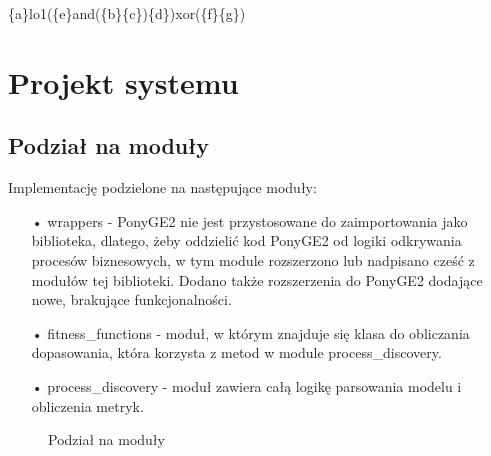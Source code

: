 \begin{center}
\{a\}lo1(\{e\}and(\{b\}\{c\})\{d\})xor(\{f\}\{g\})
\end{center}

\section{Projekt systemu}

\subsection{Podział na moduły}

Implementację podzielone na następujące moduły:
\begin{itemize}
  \item[•] wrappers - PonyGE2 nie jest przystosowane do zaimportowania jako biblioteka, dlatego, żeby oddzielić kod PonyGE2 od logiki odkrywania procesów biznesowych, w tym module rozszerzono lub nadpisano cześć z modułów tej biblioteki. Dodano także rozszerzenia do PonyGE2 dodające nowe, brakujące funkcjonalności.
  \item[•] fitness{\_}functions - moduł, w którym znajduje się klasa do obliczania dopasowania, która korzysta z metod w module process{\_}discovery.
  \item[•] process{\_}discovery - moduł zawiera całą logikę parsowania modelu i obliczenia metryk.
\end{itemize}


\begin{figure}[!ht]
	\caption{\label{fig:flow_chart}Podział na moduły}
\end{figure}

